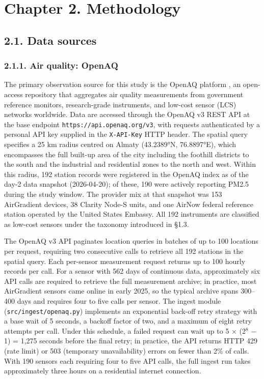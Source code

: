 \section{Chapter 2. Methodology}\label{chapter-2.-methodology}

\subsection{2.1. Data sources}\label{data-sources}

\subsubsection{2.1.1. Air quality: OpenAQ}\label{air-quality-openaq}

The primary observation source for this study is the OpenAQ platform \cite{openaq_platform}, an open-access repository that aggregates air quality measurements from government reference monitors, research-grade instruments, and low-cost sensor (LCS) networks worldwide. Data are accessed through the OpenAQ v3 REST API at the base endpoint \texttt{https://api.openaq.org/v3}, with requests authenticated by a personal API key supplied in the \texttt{X-API-Key} HTTP header. The spatial query specifies a 25 km radius centred on Almaty (43.2389°N, 76.8897°E), which encompasses the full built-up area of the city including the foothill districts to the south and the industrial and residential zones to the north and west. Within this radius, 192 station records were registered in the OpenAQ index as of the day-2 data snapshot (2026-04-20); of these, 190 were actively reporting PM2.5 during the study window. The provider mix at that snapshot was 153 AirGradient devices, 38 Clarity Node-S units, and one AirNow federal reference station operated by the United States Embassy. All 192 instruments are classified as low-cost sensors under the taxonomy introduced in §1.3.

The OpenAQ v3 API paginates location queries in batches of up to 100 locations per request, requiring two consecutive calls to retrieve all 192 stations in the spatial query. Each per-sensor measurement request returns up to 100 hourly records per call. For a sensor with 562 days of continuous data, approximately six API calls are required to retrieve the full measurement archive; in practice, most AirGradient sensors came online in early 2025, so the typical archive spans 300--400 days and requires four to five calls per sensor. The ingest module (\texttt{src/ingest/openaq.py}) implements an exponential back-off retry strategy with a base wait of 5 seconds, a backoff factor of two, and a maximum of eight retry attempts per call. Under this schedule, a failed request can wait up to 5 × (2$^8$ − 1) = 1,275 seconds before the final retry; in practice, the API returns HTTP 429 (rate limit) or 503 (temporary unavailability) errors on fewer than 2\% of calls. With 190 sensors each requiring four to five API calls, the full ingest run takes approximately three hours on a residential internet connection.

